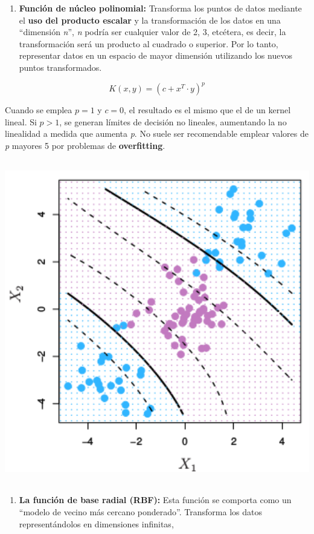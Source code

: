 \documentclass[
]{book}
\providecommand{\tightlist}{%
  \setlength{\itemsep}{0pt}\setlength{\parskip}{0pt}}
\begin{document}
\begin{enumerate}
\def\labelenumi{\arabic{enumi}.}
\setcounter{enumi}{1}
\tightlist
\item
  \textbf{Función de núcleo polinomial:} Transforma los puntos de datos mediante el \textbf{uso del producto escalar} y la transformación de los datos en una ``dimensión \emph{n}'', \emph{n} podría ser cualquier valor de 2, 3, etcétera, es decir, la transformación será un producto al cuadrado o superior. Por lo tanto, representar datos en un espacio de mayor dimensión utilizando los nuevos puntos transformados.
\end{enumerate}

\[K(x, y)=(c+ x^T \cdot y)^p\]

Cuando se emplea \(p=1\) y \(c=0\), el resultado es el mismo que el de un kernel lineal. Si \(p>1\), se generan límites de decisión no lineales, aumentando la no linealidad a medida que aumenta \emph{p}. No suele ser recomendable emplear valores de \emph{p} mayores 5 por problemas de \textbf{overfitting}.

\begin{center}\includegraphics[width=400pt,height=400pt]{img/03-svm/3-15-1-poli} \end{center}

\begin{enumerate}
\def\labelenumi{\arabic{enumi}.}
\setcounter{enumi}{2}
\tightlist
\item
  \textbf{La función de base radial (RBF):} Esta función se comporta como un ``modelo de vecino más cercano ponderado''. Transforma los datos representándolos en dimensiones infinitas,
\end{enumerate}
\end{document}
